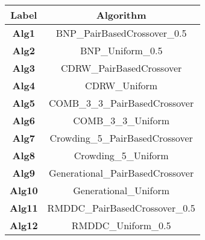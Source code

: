 \documentclass{article}
\begin{document}
\begin{table}[]
\begin{tabular}{|c|c|}
\hline
\textbf{Label} & \textbf{Algorithm} \\ \hline
\textbf{Alg1} & BNP\_PairBasedCrossover\_0.5 \\ \hline
\textbf{Alg2} & BNP\_Uniform\_0.5 \\ \hline
\textbf{Alg3} & CDRW\_PairBasedCrossover \\ \hline
\textbf{Alg4} & CDRW\_Uniform \\ \hline
\textbf{Alg5} & COMB\_3\_3\_PairBasedCrossover \\ \hline
\textbf{Alg6} & COMB\_3\_3\_Uniform \\ \hline
\textbf{Alg7} & Crowding\_5\_PairBasedCrossover \\ \hline
\textbf{Alg8} & Crowding\_5\_Uniform \\ \hline
\textbf{Alg9} & Generational\_PairBasedCrossover \\ \hline
\textbf{Alg10} & Generational\_Uniform \\ \hline
\textbf{Alg11} & RMDDC\_PairBasedCrossover\_0.5 \\ \hline
\textbf{Alg12} & RMDDC\_Uniform\_0.5 \\ \hline
\end{tabular}
\end{table}
\end{document}
